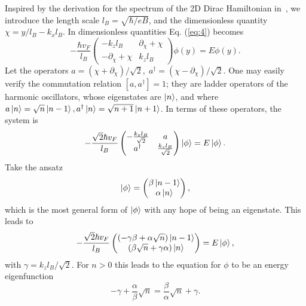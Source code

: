 Inspired by the derivation for the spectrum of the 2D Dirac Hamiltonian in~\cite{wehlingDiracMaterials2014}, we introduce the length scale $l_B = \sqrt{\hbar / eB}$, and the dimensionless quantity $\chi = y /l_{B} - k_x l_{B}$.
In dimensionless quantities Eq. (\ref{eq:4}) becomes
\begin{equation}
  -\frac{{\hbar v_F}}{l_{B}}
  \begin{pmatrix}
    -k_z l_B & \partial _{\chi } + \chi \\
    -\partial _{\chi } + \chi & k_z l_B
  \end{pmatrix}
  \phi(y)  =  E \phi(y).
\end{equation}
Let the operators \(a = \left( \chi + \partial _{\chi } \right) / \sqrt{2},\; a^{\dagger} = \left( \chi - \partial _{\chi } \right) /\sqrt{2}\).
One may easily verify the commutation relation $[a, a^{\dagger}] = 1$;
they are ladder operators of the harmonic oscillators, whose eigenstates are $\ket{n}$, and where $a\ket{n} = \sqrt{n}\ket{n-1}, a^{\dagger} \ket{n} = \sqrt{n+1} \ket{n+1}$.
In terms of these operators, the system is
\begin{equation}
  -\frac{\sqrt{2} \hbar v_F}{l_B}
  \begin{pmatrix}
    -\frac{k_zl_B}{\sqrt{2}} & a\\
    a^{\dagger} & \frac{k_zl_B}{\sqrt{2}}
  \end{pmatrix}
  \ket{\phi } = E \ket{\phi }.
\end{equation}
Take the ansatz
\begin{equation}
  \ket{\phi } =
  \begin{pmatrix}
    \beta \ket{n-1}\\
    \alpha  \ket{n}
  \end{pmatrix},
\end{equation}
which is the most general form of $\ket{\phi }$ with any hope of being an eigenstate.
This leads to
\begin{equation}
  -\frac{\sqrt{2} \hbar v_F}{l_B}
  \begin{pmatrix}
    \left( -\gamma \beta + \alpha \sqrt{n} \right) \ket{n-1}\\
    \left( \beta \sqrt{n} + \gamma \alpha \right) \ket{n}
  \end{pmatrix}
  = E \ket{\phi },
\end{equation}
with $\gamma  = k_zl_B / \sqrt{2}$.
For $n > 0$ this leads to the equation for $\phi $ to be an energy eigenfunction
\begin{equation}
  -\gamma + \frac{\alpha}{\beta } \sqrt{n} = \frac{\beta }{\alpha } \sqrt{n} + \gamma.
\end{equation}

